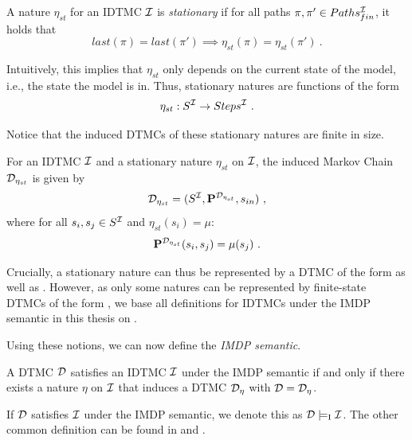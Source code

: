 \begin{definition}\label{def:stat_nature}
    A nature $\eta_{st}$ for an IDTMC $\mathcal{I}$ is \textit{stationary} if for all paths $\pi,\pi' \in Paths_{fin}^{\mathcal{I}}$, it holds that 
    \[ last(\pi) = last(\pi') \implies \eta_{st}(\pi) = \eta_{st}(\pi')\ .\]
\end{definition}
Intuitively, this implies that $\eta_{st}$ only depends on the current state of the model, i.e., the state the model is in. Thus, stationary natures are functions of the form 
\[\eta_{st}: S^\IMC \rightarrow Steps^\IMC \ .\]

Notice that the induced DTMCs of these stationary natures are finite in size.

\begin{definition}\label{def:induced_DTMC_stat_Nature}
    For an IDTMC $\mathcal{I}$ and a stationary nature $\eta_{st}$ on $\mathcal{I}$, the induced Markov Chain $\mathcal{D}_{\eta_{st}}$ is given by 
    \[ \mathcal{D}_{\eta_{st}} = (S^{\mathcal{I}}, \mathbf{P}^{\mathcal{D}_{\eta_{st}}}, s_{in})\ ,\]
    where for all $s_i,s_j\in S^{\mathcal{I}}$ and $\eta_{st}(s_i) = \mu$:
    \[ \PF^{\MC_{\eta_{st}}}(s_i,s_j) = \mu(s_j)\ . \]
\end{definition}
Crucially, a stationary nature can thus be represented by a DTMC of the form  as well as .
However, as only some natures can be represented by finite-state DTMCs of the form , we base all definitions for IDTMCs under the IMDP semantic in this thesis on .

Using these notions, we can now define the \textit{IMDP semantic}.
\begin{definition}\label{def:IMDP_semantic}
    A DTMC $\mathcal{D}$ satisfies an IDTMC $\mathcal{I}$ under the IMDP semantic if and only if there exists a nature $\eta$ on $\mathcal{I}$ that induces a DTMC $\mathcal{D}_{\eta}$ with $\mathcal{D} = \mathcal{D}_{\eta}$.
\end{definition}
If $\mathcal{D}$ satisfies $\mathcal{I}$ under the IMDP semantic, we denote this as $\mathcal{D}\models_{\text{I}}\mathcal{I}$.
The other common definition can be found in \cite{reachability_in_pIMCs_using_constraints} and \cite{Semantics_Quant-Analysis}.

